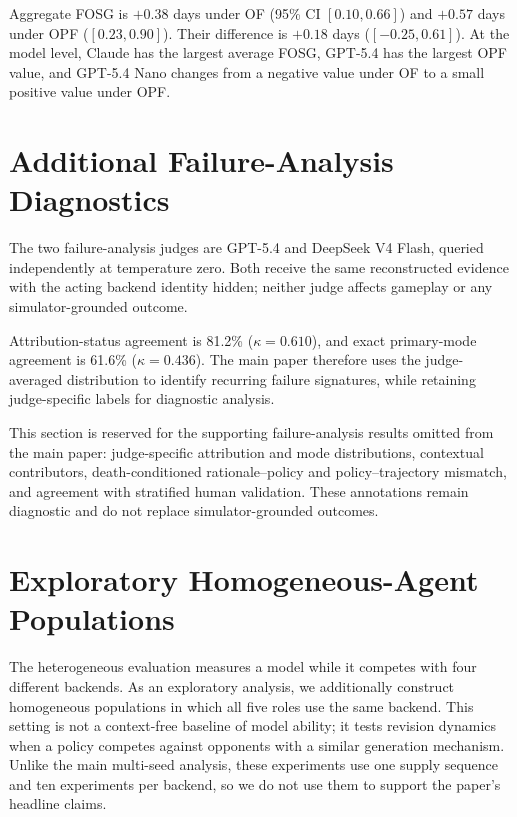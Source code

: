 Aggregate FOSG is $+0.38$ days under OF (95\% CI $[0.10,0.66]$) and
$+0.57$ days under OPF ($[0.23,0.90]$). Their difference is $+0.18$ days
($[-0.25,0.61]$). At the model level, Claude has the largest average FOSG,
GPT-5.4 has the largest OPF value, and GPT-5.4 Nano changes from a negative
value under OF to a small positive value under OPF.

\section{Additional Failure-Analysis Diagnostics}
\label{app:failure-analysis-details}

The two failure-analysis judges are GPT-5.4 and DeepSeek V4 Flash, queried
independently at temperature zero. Both receive the same reconstructed
evidence with the acting backend identity hidden; neither judge affects
gameplay or any simulator-grounded outcome.

Attribution-status agreement is 81.2\% ($\kappa=0.610$), and exact
primary-mode agreement is 61.6\% ($\kappa=0.436$). The main paper therefore
uses the judge-averaged distribution to identify recurring failure
signatures, while retaining judge-specific labels for diagnostic analysis.

This section is reserved for the supporting failure-analysis results omitted
from the main paper: judge-specific attribution and mode distributions,
contextual contributors, death-conditioned rationale--policy and
policy--trajectory mismatch, and agreement with stratified human validation.
These annotations remain diagnostic and do not replace simulator-grounded
outcomes.

\section{Exploratory Homogeneous-Agent Populations}
\label{app:homogeneous-adaptation}

The heterogeneous evaluation measures a model while it competes with
four different backends. As an exploratory analysis, we additionally
construct homogeneous populations in which all five roles use the same
backend. This setting is not a context-free baseline of model ability;
it tests revision dynamics when a policy competes against opponents with
a similar generation mechanism. Unlike the main multi-seed analysis,
these experiments use one supply sequence and ten experiments per
backend, so we do not use them to support the paper's headline claims.

